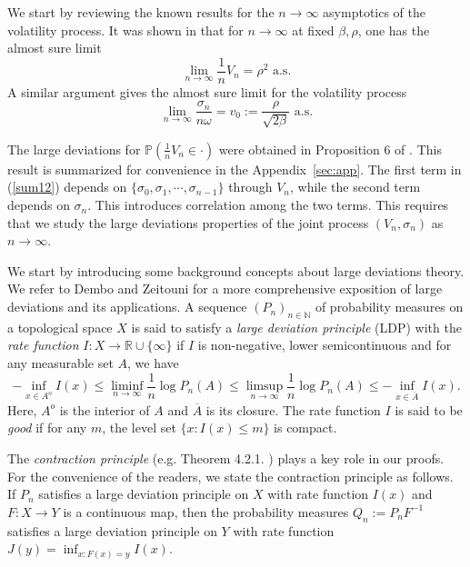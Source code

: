 \documentclass[11pt]{article}
\numberwithin{equation}{section}
\theoremstyle{plain}
\begin{document}

We start by reviewing the known results for the $n\to \infty$ asymptotics of 
the volatility process. It was shown in \cite{PZDiscreteAsian} that for 
$n\to \infty$ at fixed $\beta,\rho$, one has the almost sure limit
\begin{equation}\label{Vnas}
\lim_{n\to \infty} \frac{1}{n} V_n = \rho^2 \mbox{ a.s.}
\end{equation}
A similar argument gives the almost sure limit for the volatility process
\begin{equation}\label{signas}
\lim_{n\to \infty} \frac{\sigma_n}{n\omega} =  
v_0 := \frac{\rho}{\sqrt{2\beta}} \mbox{ a.s.}
\end{equation}



The large deviations for $\mathbb{P}(\frac{1}{n} V_n\in
\cdot)$ were obtained in Proposition 6 of \cite{PZDiscreteAsian}.
This result is summarized for convenience in the Appendix~\ref{sec:app}.
The first term in (\ref{sum12}) depends on $\{ \sigma_0,\sigma_1,\cdots , \sigma_{n-1}\}$
through $V_n$, while the second term depends on $\sigma_n$. 
This introduces correlation among the two terms. This requires that we study
the large deviations properties of the joint process $(V_n,\sigma_n)$ as 
$n\to \infty$.



We start by introducing some background concepts about large deviations theory.
We refer to Dembo and Zeitouni \cite{Dembo} for a more comprehensive exposition of
large deviations and its applications. A sequence $(P_{n})_{n\in\mathbb{N}}$ 
of probability measures on a topological space $X$ 
is said to satisfy a \textit{large deviation principle} (LDP) with the 
\textit{rate function} $I:X\rightarrow\mathbb{R}\cup\{\infty\}$ if $I$ is 
non-negative, lower semicontinuous and for any measurable set $A$, we have
\begin{equation}
-\inf_{x\in A^{o}}I(x)\leq\liminf_{n\rightarrow\infty}\frac{1}{n}\log P_{n}(A)
\leq\limsup_{n\rightarrow\infty}\frac{1}{n}\log P_{n}(A)\leq-\inf_{x\in\overline{A}}I(x).
\end{equation}
Here, $A^{o}$ is the interior of $A$ and $\overline{A}$ is its closure. 
The rate function $I$ is said to be \textit{good} if for any $m$, the level set
$\{x:I(x)\leq m\}$ is compact.

The \textit{contraction principle} (e.g. Theorem 4.2.1. \cite{Dembo})
plays a key role in our proofs. For the convenience
of the readers, we state the contraction principle as follows.
If $P_{n}$ satisfies a large deviation principle on $X$ with rate 
function $I(x)$ and $F:X\rightarrow Y$ is a continuous map,
then the probability measures $Q_{n}:=P_{n}F^{-1}$ satisfies
a large deviation principle on $Y$ with rate function
$J(y)=\inf_{x: F(x)=y}I(x)$.
\end{document}
